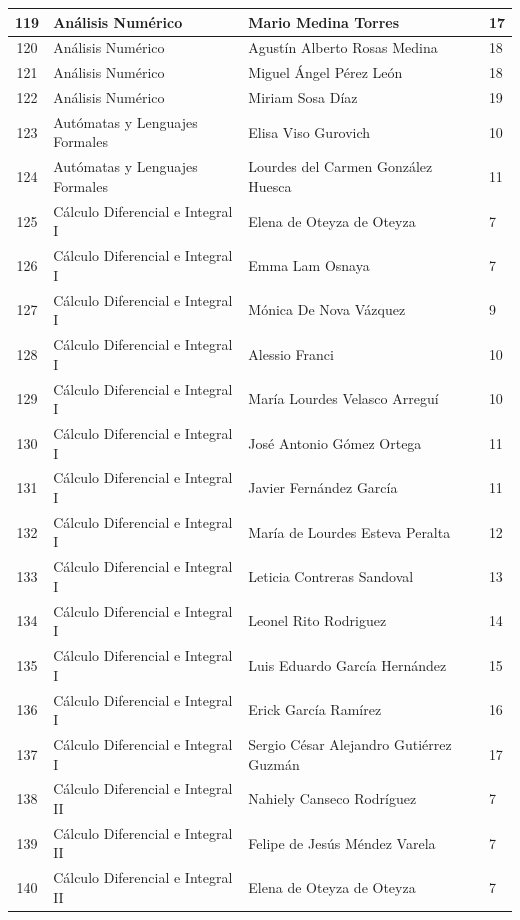 {\begin{longtable}{|c|p{6.5cm}|p{5cm}|p{1.5cm}|}
  119 & Análisis Numérico & Mario Medina Torres & 17 \\ \hline 
  120 & Análisis Numérico & Agustín Alberto Rosas Medina & 18 \\ \hline 
  121 & Análisis Numérico & Miguel Ángel Pérez León & 18 \\ \hline 
  122 & Análisis Numérico & Miriam Sosa Díaz & 19 \\ \hline 
  123 & Autómatas y Lenguajes Formales & Elisa Viso Gurovich & 10 \\ \hline 
  124 & Autómatas y Lenguajes Formales & Lourdes del Carmen González Huesca & 11 \\ \hline 
  125 & Cálculo Diferencial e Integral I & Elena de Oteyza de Oteyza & 7 \\ \hline 
  126 & Cálculo Diferencial e Integral I & Emma Lam Osnaya & 7 \\ \hline 
  127 & Cálculo Diferencial e Integral I & Mónica De Nova Vázquez & 9 \\ \hline 
  128 & Cálculo Diferencial e Integral I & Alessio Franci & 10 \\ \hline 
  129 & Cálculo Diferencial e Integral I & María Lourdes Velasco Arreguí & 10 \\ \hline 
  130 & Cálculo Diferencial e Integral I & José Antonio Gómez Ortega & 11 \\ \hline 
  131 & Cálculo Diferencial e Integral I & Javier Fernández García & 11 \\ \hline 
  132 & Cálculo Diferencial e Integral I & María de Lourdes Esteva Peralta & 12 \\ \hline 
  133 & Cálculo Diferencial e Integral I & Leticia Contreras Sandoval & 13 \\ \hline 
  134 & Cálculo Diferencial e Integral I & Leonel Rito Rodriguez & 14 \\ \hline 
  135 & Cálculo Diferencial e Integral I & Luis Eduardo García Hernández & 15 \\ \hline 
  136 & Cálculo Diferencial e Integral I & Erick García Ramírez & 16 \\ \hline 
  137 & Cálculo Diferencial e Integral I & Sergio César Alejandro Gutiérrez Guzmán & 17 \\ \hline 
  138 & Cálculo Diferencial e Integral II & Nahiely Canseco Rodríguez & 7 \\ \hline 
  139 & Cálculo Diferencial e Integral II & Felipe de Jesús Méndez Varela & 7 \\ \hline 
  140 & Cálculo Diferencial e Integral II & Elena de Oteyza de Oteyza & 7 \\ \hline 

\end{longtable}}
